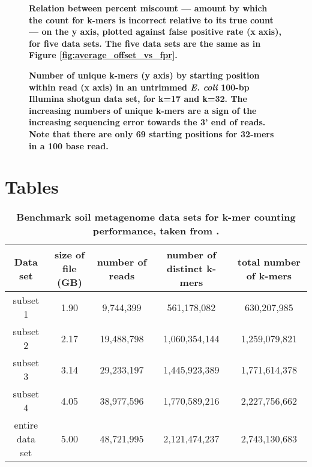 \begin{figure}[!ht]
\caption{\bf Relation between percent miscount --- amount by which the
  count for k-mers is incorrect relative to its true count --- on the
  y axis, plotted against false positive rate (x axis), for five data
  sets.  The five data sets are the same as in Figure
  \ref{fig:average_offset_vs_fpr}.}
\label{fig:percent_offset_vs_fpr}
\end{figure}

\begin{figure}[!ht]
\caption{\bf Number of unique k-mers (y axis) by starting position
  within read (x axis) in an untrimmed {\em E. coli} 100-bp Illumina
  shotgun data set, for k=17 and k=32.  The increasing numbers of
  unique k-mers are a sign of the increasing sequencing error towards
  the 3' end of reads.  Note that there are only 69 starting positions
  for 32-mers in a 100 base read.}
\label{fig:perc_unique_pos}
\end{figure}

\clearpage
\section*{Tables}

\begin{table}[!ht]
\caption{
\bf{Benchmark soil metagenome data sets for k-mer counting performance, taken from
\cite{Howe2012}.}}
\begin{tabular}{ |c | c |c| c|c| }
\hline
Data set & size of file (GB) & number of reads & number of distinct
k-mers & total number of k-mers \\
\hline
subset 1        & 1.90 &  9,744,399 &   561,178,082 &   630,207,985 \\
subset 2        & 2.17 & 19,488,798 & 1,060,354,144 & 1,259,079,821 \\
subset 3        & 3.14 & 29,233,197 & 1,445,923,389 & 1,771,614,378 \\
subset 4        & 4.05 & 38,977,596 & 1,770,589,216 & 2,227,756,662 \\
entire data set & 5.00 & 48,721,995 & 2,121,474,237 & 2,743,130,683 \\
\end{tabular}
\begin{flushleft}
\end{flushleft}
\label{table:datasets}
\end{table}

